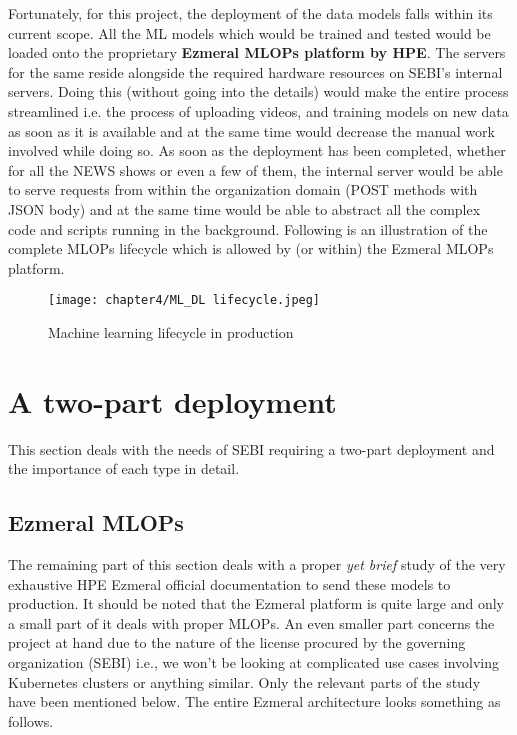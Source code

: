 Fortunately, for this project, the deployment of the data models falls within its current scope. All the ML models which would be trained and tested would be loaded onto the proprietary \textbf{Ezmeral MLOPs platform by HPE}. The servers for the same reside alongside the required hardware resources on SEBI’s internal servers. Doing this (without going into the details) would make the entire process streamlined i.e. the process of uploading videos, and training models on new data as soon as it is available and at the same time would decrease the manual work involved while doing so. As soon as the deployment has been completed, whether for all the NEWS shows or even a few of them, the internal server would be able to serve requests from within the organization domain (POST methods with JSON body) and at the same time would be able to abstract all the complex code and scripts running in the background. Following is an illustration of the complete MLOPs lifecycle which is allowed by (or within) the Ezmeral MLOPs platform.

\begin{figure}[h]
  \centering
  \texttt{[image: chapter4/ML\_DL lifecycle.jpeg]}
  \caption{Machine learning lifecycle in production}
  \label{fig:ml_dl_cycle}
\end{figure}

\section{A two-part deployment}

This section deals with the needs of SEBI requiring a two-part deployment and the importance of each type in detail.

\subsection{Ezmeral MLOPs} \label{ezmeral}

The remaining part of this section deals with a proper \textit{yet brief} study of the very exhaustive HPE Ezmeral official documentation to send these models to production. It should be noted that the Ezmeral platform is quite large and only a small part of it deals with proper MLOPs. An even smaller part concerns the project at hand due to the nature of the license procured by the governing organization (SEBI) i.e., we won’t be looking at complicated use cases involving Kubernetes clusters or anything similar. Only the relevant parts of the study have been mentioned below.
The entire Ezmeral architecture looks something as follows. \newpage

